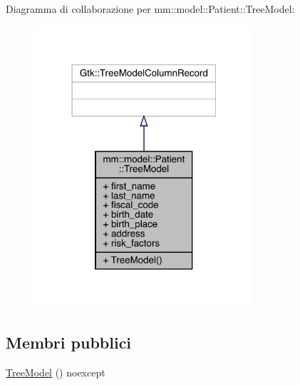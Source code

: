 Diagramma di collaborazione per mm\+:\+:model\+:\+:Patient\+:\+:Tree\+Model\+:\nopagebreak
\begin{figure}[H]
\begin{center}
\leavevmode
\includegraphics[width=231pt]{d6/d84/structmm_1_1model_1_1_patient_1_1_tree_model__coll__graph}
\end{center}
\end{figure}
\subsection*{Membri pubblici}
\begin{DoxyCompactItemize}
\item 
\hyperlink{structmm_1_1model_1_1_patient_1_1_tree_model_a53ebc678daee18b03328be60d1c69bf4}{Tree\+Model} () noexcept
\end{DoxyCompactItemize}
